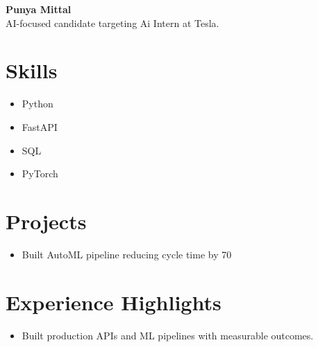 \documentclass[11pt]{article}
\begin{document}
\begin{center}
{\LARGE \textbf{Punya Mittal}}\\
AI-focused candidate targeting Ai Intern at Tesla.
\end{center}
\section*{Skills}
\begin{itemize}
\item Python \item FastAPI \item SQL \item PyTorch
\end{itemize}
\section*{Projects}
\begin{itemize}
\item Built AutoML pipeline reducing cycle time by 70%
\end{itemize}
\section*{Experience Highlights}
\begin{itemize}
\item Built production APIs and ML pipelines with measurable outcomes.
\end{itemize}
\end{document}
